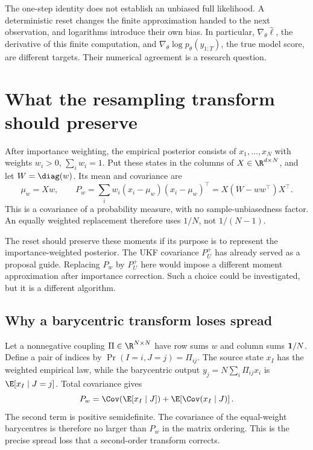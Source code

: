 The one-step identity does not establish an unbiased full likelihood.
A deterministic reset changes the finite approximation handed to the
next observation, and logarithms introduce their own bias. In particular,
\(\nabla_\theta\widehat\ell\), the derivative of this finite computation,
and \(\nabla_\theta\log p_\theta(y_{1:T})\), the true model score, are
different targets. Their numerical agreement is a research question.


\section{What the resampling transform should preserve}

After importance weighting, the empirical posterior consists of
\(x_1,\ldots,x_N\) with weights \(w_i>0\), \(\sum_iw_i=1\). Put these states
in the columns of \(X\in\R^{d\times N}\), and let \(W=\diag(w)\). Its mean
and covariance are
\begin{equation}
\label{eq:bf-covariance-proposal-weighted-moments}
 \mu_w=Xw,\qquad
 P_w=\sum_iw_i(x_i-\mu_w)(x_i-\mu_w)^\top
     =X(W-ww^\top)X^\top .
\end{equation}
This is a covariance of a probability measure, with no sample-unbiasedness
factor. An equally weighted replacement therefore uses \(1/N\), not
\(1/(N-1)\).

The reset should preserve these moments if its purpose is to represent
the importance-weighted posterior. The UKF covariance \(P_U^+\) has already
served as a proposal guide. Replacing \(P_w\) by \(P_U^+\) here would impose
a different moment approximation after importance correction. Such a
choice could be investigated, but it is a different algorithm.

\subsection{Why a barycentric transform loses spread}

Let a nonnegative coupling \(\Pi\in\R^{N\times N}\) have row sums \(w\)
and column sums \(\mathbf 1/N\). Define a pair of indices by
\(\Pr(I=i,J=j)=\Pi_{ij}\). The source state \(x_I\) has the weighted
empirical law, while the barycentric output
\(y_j=N\sum_i\Pi_{ij}x_i\) is \(\E[x_I\mid J=j]\). Total covariance gives
\begin{equation}
\label{eq:bf-covariance-proposal-barycentric-loss}
 P_w
 =\Cov\!\left(\E[x_I\mid J]\right)
  +\E\!\left[\Cov(x_I\mid J)\right].
\end{equation}
The second term is positive semidefinite. The covariance of the equal-weight
barycentres is therefore no larger than \(P_w\) in the matrix ordering.
This is the precise spread loss that a second-order transform corrects.

